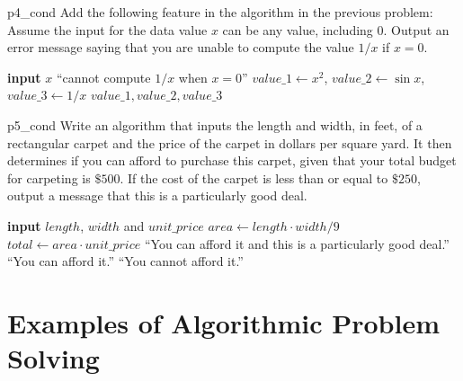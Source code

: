 \begin{problem}{}{p4_cond}
Add the following feature in the algorithm in the previous problem: Assume the input for the data value $x$ can be any value, including $0$. Output an error message saying that you are unable to compute the value $1/x$ if $x = 0$.	
\end{problem}
\begin{algorithm}[H]
\caption*{Algorithm for Problem ~\ref{prob:p4_cond}}
\begin{algorithmic}[1]
	\Repeat
	\State \textbf{input} $x$
		\State \Output ``cannot compute $1/x$ when $x = 0$''
	\Else
		\State $value\_1 \gets x^2$, $value\_2 \gets \sin x$, $value\_3\gets 1/x$ 
		\State \Output $value\_1, value\_2, value\_3$
	\EndIf
\end{algorithmic}
\end{algorithm}

\begin{problem}{}{p5_cond}
Write an algorithm that inputs the length and width, in feet, of a rectangular carpet and the price of the carpet in dollars per square yard. It then determines if you can afford to purchase this carpet, given that your total budget for carpeting is $\$500$. If the cost of the carpet is less than or equal to $\$250$, output a message that this is a particularly good deal.
\end{problem}

\begin{algorithm}[H]
	\caption*{Algorithm for problem ~\ref{prob:p5_cond}}
	\begin{algorithmic}[1]
		\State \textbf{input} $length$, $width$ and $unit\_price$
		\State $area\gets length\cdot width / 9$
		\State  $total\gets area\cdot unit\_price$
			\State \Output ``You can afford it and this is a particularly good deal.''
			\State \Output ``You can afford it.''
		\Else
			\State \Output ``You cannot afford it.''
		\EndIf
	\end{algorithmic}
\end{algorithm}

\section{Examples of Algorithmic Problem Solving}
